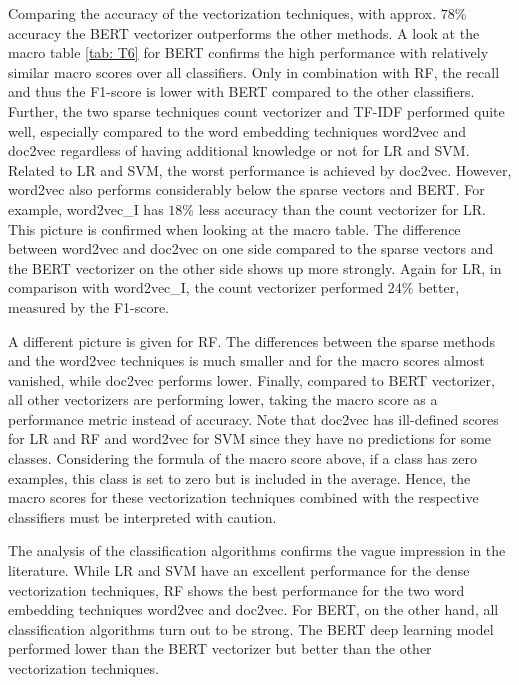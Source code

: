 \documentclass[12pt, a4paper, titlepage]{article}
\begin{document}
Comparing the accuracy of the vectorization techniques, with approx. $78\%$ accuracy the \ac{BERT} vectorizer outperforms the other methods. A look at the macro table \ref{tab: T6} for \ac{BERT} confirms the high performance with relatively similar macro scores over all classifiers. Only in combination with \ac{RF}, the recall and thus the F1-score is lower with \ac{BERT} compared to the other classifiers. Further, the two sparse techniques count vectorizer and \ac{TF-IDF} performed quite well, especially compared to the word embedding techniques word2vec and doc2vec regardless of having additional knowledge or not for \ac{LR} and \ac{SVM}. Related to \ac{LR} and \ac{SVM}, the worst performance is achieved by doc2vec. However, word2vec also performs considerably below the sparse vectors and \ac{BERT}. For example, word2vec\_I has $18\%$ less accuracy than the count vectorizer for \ac{LR}. This picture is confirmed when looking at the macro table. The difference between word2vec and doc2vec on one side compared to the sparse vectors and the \ac{BERT} vectorizer on the other side shows up more strongly. Again for \ac{LR}, in comparison with word2vec\_I, the count vectorizer performed $24\%$ better, measured by the F1-score. 

A different picture is given for \ac{RF}. The differences between the sparse methods and the word2vec techniques is much smaller and for the macro scores almost vanished, while doc2vec performs lower. Finally, compared to \ac{BERT} vectorizer, all other vectorizers are performing lower, taking the macro score as a performance metric instead of accuracy. Note that doc2vec has ill-defined scores for \ac{LR} and \ac{RF} and word2vec for \ac{SVM} since they have no predictions for some classes. Considering the formula of the macro score above, if a class has zero examples, this class is set to zero but is included in the average. Hence, the macro scores for these vectorization techniques combined with the respective classifiers must be interpreted with caution. 

The analysis of the classification algorithms confirms the vague impression in the literature. While LR and SVM have an excellent performance for the dense vectorization techniques, RF shows the best performance for the two word embedding techniques word2vec and doc2vec. For \ac{BERT}, on the other hand, all classification algorithms turn out to be strong. The \ac{BERT} deep learning model performed lower than the \ac{BERT} vectorizer but better than the other vectorization techniques. 
\end{document}
